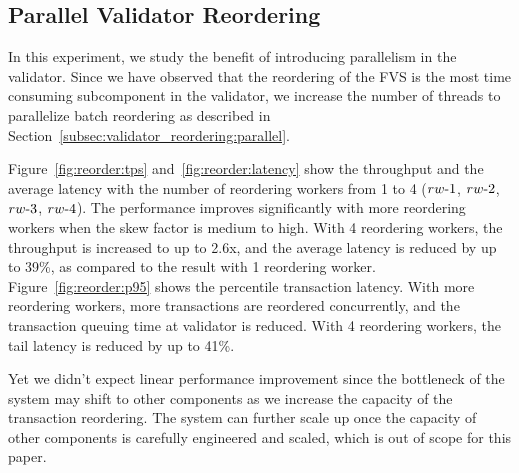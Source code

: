 \subsection{Parallel Validator Reordering}
In this experiment, we study the benefit of introducing parallelism in the validator. Since we have observed that the reordering of the FVS is the most time consuming subcomponent in the validator, we increase the number of threads to parallelize batch reordering as described in Section~\ref{subsec:validator_reordering:parallel}. 

Figure~\ref{fig:reorder:tps} and~\ref{fig:reorder:latency} show the throughput
and the average latency with the number of reordering workers from 1 to 4
($rw\hbox{-}1$, $rw\hbox{-}2$, $rw\hbox{-}3$, $rw\hbox{-}4$). The performance improves significantly with more reordering workers when the skew factor is medium to high. With 4 reordering workers, the throughput is increased to up to 2.6x, and the average latency is reduced by up to 39\%, as compared to the result with 1 reordering worker. Figure~\ref{fig:reorder:p95} shows the percentile transaction latency. With more reordering workers, more transactions are reordered concurrently, and the transaction queuing time at validator is reduced. With 4 reordering workers, the tail latency is reduced by up to 41\%. 

Yet we didn't expect linear performance improvement since the bottleneck of the system may shift to other
components as we increase the capacity of the transaction reordering. The system can further scale up once the capacity
of other components is carefully engineered and scaled,
which is out of scope for this paper.
